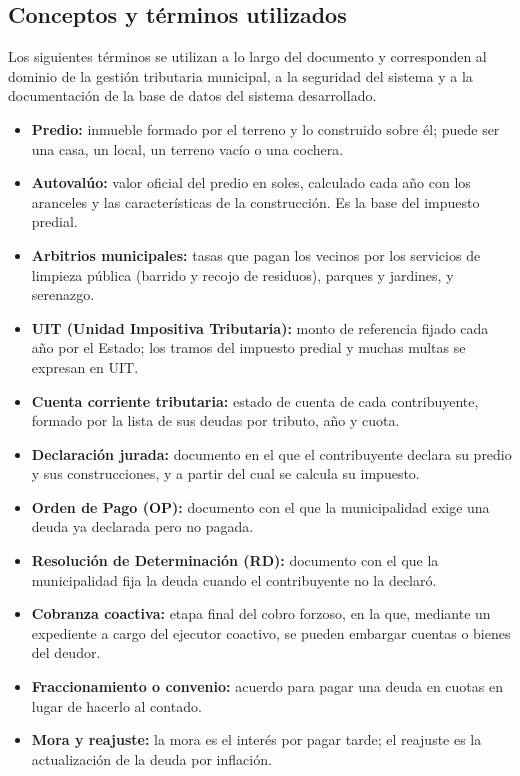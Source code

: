 \documentclass[12pt,a4paper]{report}
\begin{document}
\subsection{Conceptos y términos utilizados}

Los siguientes términos se utilizan a lo largo del documento y corresponden al dominio de la gestión tributaria municipal, a la seguridad del sistema y a la documentación de la base de datos del sistema desarrollado.

\begin{itemize}[leftmargin=1.25cm,itemsep=0pt,topsep=0pt]
  \item \textbf{Predio:} inmueble formado por el terreno y lo construido sobre él; puede ser una casa, un local, un terreno vacío o una cochera.
  \item \textbf{Autovalúo:} valor oficial del predio en soles, calculado cada año con los aranceles y las características de la construcción. Es la base del impuesto predial.
  \item \textbf{Arbitrios municipales:} tasas que pagan los vecinos por los servicios de limpieza pública (barrido y recojo de residuos), parques y jardines, y serenazgo.
  \item \textbf{UIT (Unidad Impositiva Tributaria):} monto de referencia fijado cada año por el Estado; los tramos del impuesto predial y muchas multas se expresan en UIT.
  \item \textbf{Cuenta corriente tributaria:} estado de cuenta de cada contribuyente, formado por la lista de sus deudas por tributo, año y cuota.
  \item \textbf{Declaración jurada:} documento en el que el contribuyente declara su predio y sus construcciones, y a partir del cual se calcula su impuesto.
  \item \textbf{Orden de Pago (OP):} documento con el que la municipalidad exige una deuda ya declarada pero no pagada.
  \item \textbf{Resolución de Determinación (RD):} documento con el que la municipalidad fija la deuda cuando el contribuyente no la declaró.
  \item \textbf{Cobranza coactiva:} etapa final del cobro forzoso, en la que, mediante un expediente a cargo del ejecutor coactivo, se pueden embargar cuentas o bienes del deudor.
  \item \textbf{Fraccionamiento o convenio:} acuerdo para pagar una deuda en cuotas en lugar de hacerlo al contado.
  \item \textbf{Mora y reajuste:} la mora es el interés por pagar tarde; el reajuste es la actualización de la deuda por inflación.

\end{itemize}
\end{document}
